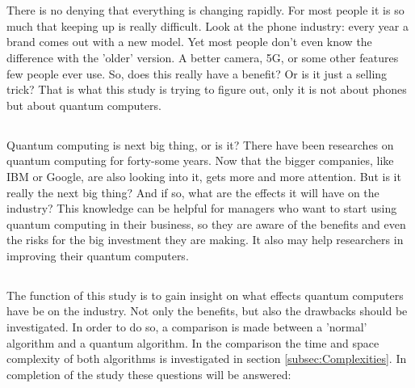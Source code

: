 
\chapter{}
\label{ch:inleiding}

There is no denying that everything is changing rapidly. For most people it is so much that keeping up is really difficult.
Look at the phone industry: every year a brand comes out with a new model. Yet most people don't even know the difference with the 'older' version.
A better camera, 5G, or some other features few people ever use. So, does this really have a benefit? Or is it just a selling trick?
That is what this study is trying to figure out, only it is not about phones but about quantum computers.

\section{}
\label{sec:probleemstelling}
Quantum computing is next big thing, or is it? There have been researches on quantum computing for forty-some years.
Now that the bigger companies, like IBM or Google, are also looking into it, gets more and more attention. 
But is it really the next big thing? And if so, what are the effects it will have on the industry?
This knowledge can be helpful for managers who want to start using quantum computing in their business, so they are aware of the benefits and even the risks for the big investment they are making.
It also may help researchers in improving their quantum computers.

\section{}
\label{sec:onderzoeksvraag}

The function of this study is to gain insight on what effects quantum computers have be on the industry.
Not only the benefits, but also the drawbacks should be investigated. In order to do so, a comparison is made between a 'normal' algorithm and a quantum algorithm.
In the comparison the time and space complexity of both algorithms is investigated in section \ref*{subsec:Complexities}.
In completion of the study these questions will be answered:

